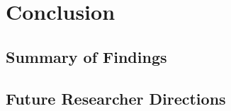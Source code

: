 
\chapter{Conclusion}\label{chapter:conclusion}

\section{Summary of Findings}\label{chapter:summary}
\section{Future Researcher Directions}\label{chapter:future}
